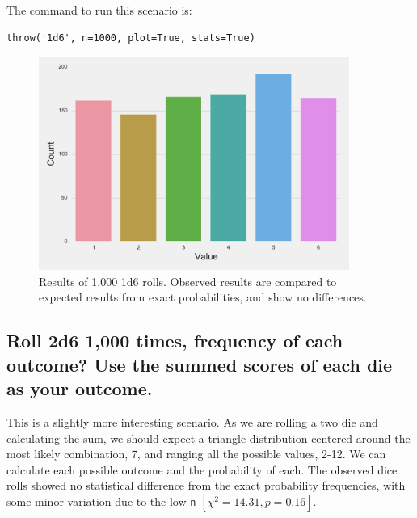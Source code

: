 \documentclass{article}
\begin{document}
The command to run this scenario is:
\begin{lstlisting}
throw('1d6', n=1000, plot=True, stats=True)
\end{lstlisting}

\begin{figure}[H]
\begin{floatrow}
\includegraphics[width=4in]{1d6.pdf}
\end{floatrow}
\caption{Results of 1,000 1d6 rolls. Observed results are compared to expected results from exact probabilities, and show no differences.}
\end{figure}

\subsection{Roll 2d6 1,000 times, frequency of each outcome? Use the summed scores of each die as your outcome.}
This is a slightly more interesting scenario. As we are rolling a two die and calculating the sum, we should expect a triangle distribution centered around the most likely combination, 7, and ranging all the possible values, 2-12. We can calculate each possible outcome and the probability of each. The observed dice rolls showed no statistical difference from the exact probability frequencies, with some minor variation due to the low \texttt{n} $[\chi^2=14.31, p=0.16]$.
\end{document}
